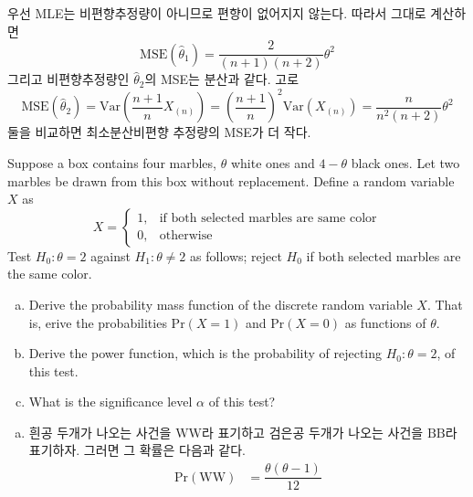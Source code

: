 \documentclass[answers]{exam}
\begin{document}
\begin{questions}
\begin{solution}
\begin{enumerate}[(a)]
\begin{equation}
        \end{equation}
        우선 MLE는 비편향추정량이 아니므로 편향이 없어지지 않는다. 따라서 그대로 계산하면
        \begin{equation}
          \mathrm{MSE}\left(\widehat{\theta}_{1}\right) = \dfrac{2}{\left(n+1\right)\left(n+2\right)}\theta^{2}
        \end{equation}
        그리고 비편향추정량인 $\widehat{\theta}_{2}$의 MSE는 분산과 같다. 고로
        \begin{equation}
          \mathrm{MSE}\left(\widehat{\theta}_{2}\right)= \mathrm{Var}\left(\dfrac{n+1}{n}X_{\left(n\right)}\right)=\left(\dfrac{n+1}{n}\right)^{2}\mathrm{Var}\left(X_{\left(n\right)}\right)=\dfrac{n}{n^{2}\left(n+2\right)}\theta^{2}
        \end{equation}
        둘을 비교하면 최소분산비편향 추정량의 MSE가 더 작다.
      \end{enumerate}
    \end{solution}
    \question
    Suppose a box contains four marbles, $\theta$ white ones and $4-\theta$ black ones. Let two marbles be drawn from this box without replacement. Define a random variable $X$ as
    $$
      X=\begin{cases}1, & \text{if both selected marbles are same color}\\0, & \text{otherwise} \end{cases}
    $$
    Test $H_{0}:\theta=2$ against $H_{1}:\theta\neq2$ as follows; reject $H_{0}$ if both selected marbles are the same color.
    \begin{enumerate}[(a)]
      \item Derive the probability mass function of the discrete random variable $X$. That is, erive the probabilities $\mathrm{Pr}\left(X=1\right)$ and $\mathrm{Pr}\left(X=0\right)$ as functions of $\theta$.
      \item Derive the power function, which is the probability of rejecting $H_{0}:\theta=2$, of this test.
      \item What is the significance level $\alpha$ of this test?
    \end{enumerate}
    \begin{solution}
      \begin{enumerate}[(a)]
        \item 흰공 두개가 나오는 사건을 $\mathrm{WW}$라 표기하고 검은공 두개가 나오는 사건을 $\mathrm{BB}$라 표기하자. 그러면 그 확률은 다음과 같다.
        \begin{align}
          \mathrm{Pr}\left(\mathrm{WW}\right) &= \dfrac{\theta\left(\theta-1\right)}{12}\\

\end{align}
\end{enumerate}
\end{solution}
\end{questions}
\end{document}
